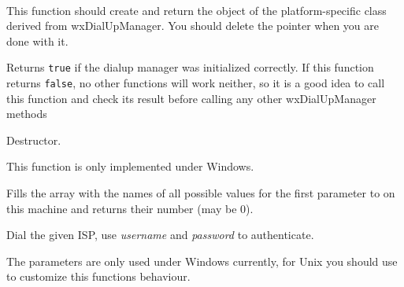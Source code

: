
\\


\label{wxdialupmanagercreate}


This function should create and return the object of the platform-specific
class derived from wxDialUpManager. You should delete the pointer when you are
done with it.

\label{wxdialupmanagerisok}


Returns {\tt true} if the dialup manager was initialized correctly. If this
function returns {\tt false}, no other functions will work neither, so it is a
good idea to call this function and check its result before calling any other
wxDialUpManager methods

\label{wxdialupmanagerdtor}


Destructor.

\label{wxdialupmanagergetispnames}


This function is only implemented under Windows.

Fills the array with the names of all possible values for the first
parameter to  on this machine and returns
their number (may be $0$).

\label{wxdialupmanagerdial}


Dial the given ISP, use {\it username} and {\it password} to authenticate.

The parameters are only used under Windows currently, for Unix you should use 
 to customize this
functions behaviour.

